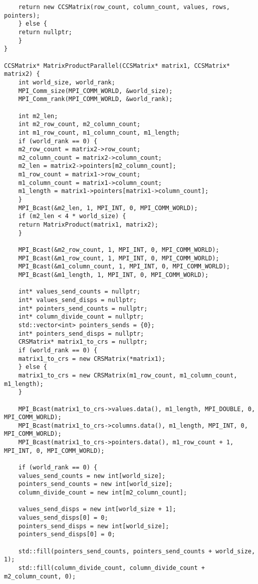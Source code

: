 \documentclass{report}
\begin{document}
\begin{lstlisting}
    return new CCSMatrix(row_count, column_count, values, rows, pointers);
    } else {
    return nullptr;
    }
}

CCSMatrix* MatrixProductParallel(CCSMatrix* matrix1, CCSMatrix* matrix2) {
    int world_size, world_rank;
    MPI_Comm_size(MPI_COMM_WORLD, &world_size);
    MPI_Comm_rank(MPI_COMM_WORLD, &world_rank);

    int m2_len;
    int m2_row_count, m2_column_count;
    int m1_row_count, m1_column_count, m1_length;
    if (world_rank == 0) {
    m2_row_count = matrix2->row_count;
    m2_column_count = matrix2->column_count;
    m2_len = matrix2->pointers[m2_column_count];
    m1_row_count = matrix1->row_count;
    m1_column_count = matrix1->column_count;
    m1_length = matrix1->pointers[matrix1->column_count];
    }
    MPI_Bcast(&m2_len, 1, MPI_INT, 0, MPI_COMM_WORLD);
    if (m2_len < 4 * world_size) {
    return MatrixProduct(matrix1, matrix2);
    }

    MPI_Bcast(&m2_row_count, 1, MPI_INT, 0, MPI_COMM_WORLD);
    MPI_Bcast(&m1_row_count, 1, MPI_INT, 0, MPI_COMM_WORLD);
    MPI_Bcast(&m1_column_count, 1, MPI_INT, 0, MPI_COMM_WORLD);
    MPI_Bcast(&m1_length, 1, MPI_INT, 0, MPI_COMM_WORLD);

    int* values_send_counts = nullptr;
    int* values_send_disps = nullptr;
    int* pointers_send_counts = nullptr;
    int* column_divide_count = nullptr;
    std::vector<int> pointers_sends = {0};
    int* pointers_send_disps = nullptr;
    CRSMatrix* matrix1_to_crs = nullptr;
    if (world_rank == 0) {
    matrix1_to_crs = new CRSMatrix(*matrix1);
    } else {
    matrix1_to_crs = new CRSMatrix(m1_row_count, m1_column_count, m1_length);
    }

    MPI_Bcast(matrix1_to_crs->values.data(), m1_length, MPI_DOUBLE, 0, MPI_COMM_WORLD);
    MPI_Bcast(matrix1_to_crs->columns.data(), m1_length, MPI_INT, 0, MPI_COMM_WORLD);
    MPI_Bcast(matrix1_to_crs->pointers.data(), m1_row_count + 1, MPI_INT, 0, MPI_COMM_WORLD);

    if (world_rank == 0) {
    values_send_counts = new int[world_size];
    pointers_send_counts = new int[world_size];
    column_divide_count = new int[m2_column_count];

    values_send_disps = new int[world_size + 1];
    values_send_disps[0] = 0;
    pointers_send_disps = new int[world_size];
    pointers_send_disps[0] = 0;

    std::fill(pointers_send_counts, pointers_send_counts + world_size, 1);
    std::fill(column_divide_count, column_divide_count + m2_column_count, 0);


\end{lstlisting}
\end{document}
